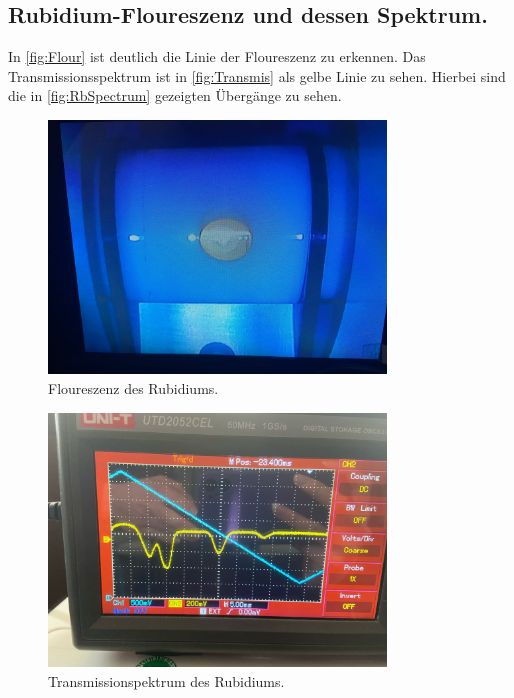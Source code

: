 \subsection{Rubidium-Floureszenz und dessen Spektrum.}
\label{sec:Ausw2}
In \autoref{fig:Flour} ist deutlich die Linie der Floureszenz zu erkennen. Das Transmissionsspektrum ist in \autoref{fig:Transmis} als gelbe Linie zu sehen. Hierbei sind die in \autoref{fig:RbSpectrum} gezeigten Übergänge zu sehen.

\begin{figure}
    \centering
        \includegraphics[width=0.8\textwidth]{Luminiszenz.jpeg}
        \caption{Floureszenz des Rubidiums.}
        \label{fig:Flour} 
\end{figure}

\begin{figure}
    \centering
        \includegraphics[width=0.8\textwidth]{Spectrum.jpeg}
        \caption{Transmissionspektrum des Rubidiums.}
        \label{fig:Flour} 
\end{figure}